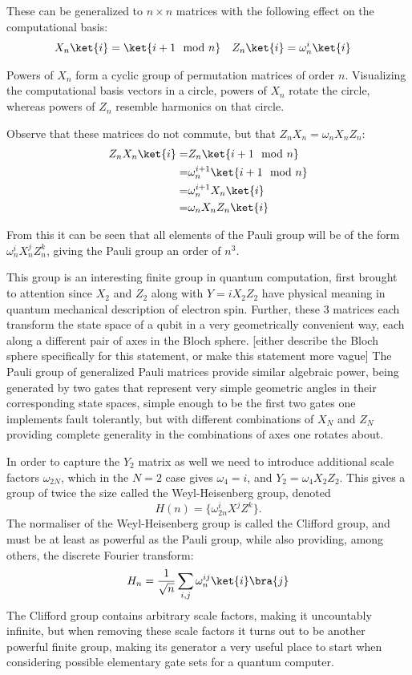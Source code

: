 These can be generalized to $n\times n$ matrices with the following effect on the computational basis:
\begin{align*}
X_n\ket{i} = \ket{i+1\mod n}
&&&
Z_n\ket{i} = \omega_n^i\ket{i}
\end{align*}

Powers of $X_n$ form a cyclic group of permutation matrices of order $n$. Visualizing the computational basis vectors in a circle, powers of $X_n$ rotate the circle, whereas powers of $Z_n$ resemble harmonics on that circle.

Observe that these matrices do not commute, but that $Z_nX_n = \omega_nX_nZ_n$:
\begin{align*}
	Z_nX_n\ket{i}
	=& Z_n\ket{i+1\mod n}
	\\=& \omega_n^{i+1}\ket{i+1\mod n}
	\\=& \omega_n^{i+1}X_n\ket{i}
	\\=& \omega_nX_nZ_n\ket{i}
\end{align*}

From this it can be seen that all elements of the Pauli group will be of the form $\omega_n^iX_n^jZ_n^k$, giving the Pauli group an order of $n^3$.

This group is an interesting finite group in quantum computation, first brought to attention since $X_2$ and $Z_2$ along with $Y  = iX_2Z_2$ have physical meaning in quantum mechanical description of electron spin. Further, these 3 matrices each transform the state space of a qubit in a very geometrically convenient way, each along a different pair of axes in the Bloch sphere. [either describe the Bloch sphere specifically for this statement, or make this statement more vague] The Pauli group of generalized Pauli matrices provide similar algebraic power, being generated by two gates that represent very simple geometric angles in their corresponding state spaces, simple enough to be the first two gates one implements fault tolerantly, but with different combinations of $X_N$ and $Z_N$ providing complete generality in the combinations of axes one rotates about.

In order to capture the $Y_2$ matrix as well we need to introduce additional scale factors $\omega_{2N}$, which in the $N=2$ case gives $\omega_4 = i$, and $Y_2 = \omega_{4}X_2Z_2$. This gives a group of twice the size called the Weyl-Heisenberg group, denoted
\[H(n) = \{\omega_{2n}^iX^jZ^k\}.\]
The normaliser of the Weyl-Heisenberg group is called the Clifford group, and must be at least as powerful as the Pauli group, while also providing, among others, the discrete Fourier transform:
\[H_n = \frac{1}{\sqrt{n}}\sum_{i,j} \omega_n^{ij}\ket{i}\bra{j}\]
The Clifford group contains arbitrary scale factors, making it uncountably infinite, but when removing these scale factors it turns out to be another powerful finite group, making its generator a very useful place to start when considering possible elementary gate sets for a quantum computer.

